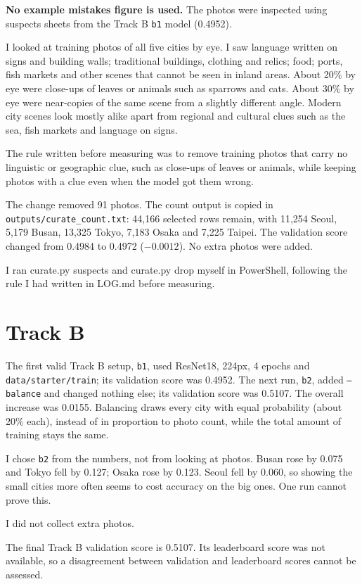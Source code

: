 \documentclass[11pt]{article}
\begin{document}
\textbf{No example mistakes figure is used.} The photos were inspected using
suspects sheets from the Track B \texttt{b1} model (0.4952).

I looked at training photos of all five cities by eye. I saw language written on
signs and building walls; traditional buildings, clothing and relics; food;
ports, fish markets and other scenes that cannot be seen in inland areas. About
20\% by eye were close-ups of leaves or animals such as sparrows and cats. About
30\% by eye were near-copies of the same scene from a slightly different angle.
Modern city scenes look mostly alike apart from regional and cultural clues such
as the sea, fish markets and language on signs.

The rule written before measuring was to remove training photos that carry no
linguistic or geographic clue, such as close-ups of leaves or animals, while
keeping photos with a clue even when the model got them wrong.

The change removed 91 photos. The count output is copied in
\texttt{outputs/curate\_count.txt}: 44,166 selected rows remain, with 11,254
Seoul, 5,179 Busan, 13,325 Tokyo, 7,183 Osaka and 7,225 Taipei. The validation
score changed from 0.4984 to 0.4972 ($-0.0012$). No extra photos were added.

I ran curate.py suspects and curate.py drop myself in PowerShell, following the rule I had written in LOG.md before measuring.

\section*{Track B}

The first valid Track B setup, \texttt{b1}, used ResNet18, 224px, 4 epochs and
\texttt{data/starter/train}; its validation score was 0.4952. The next run,
\texttt{b2}, added \texttt{--balance} and changed nothing else; its validation
score was 0.5107. The overall increase was 0.0155. Balancing draws every city
with equal probability (about 20\% each), instead of in proportion to photo
count, while the total amount of training stays the same.

I chose \texttt{b2} from the numbers, not from looking at photos. Busan rose by
0.075 and Tokyo fell by 0.127; Osaka rose by 0.123. Seoul fell by 0.060, so showing the small cities more often seems to cost
accuracy on the big ones. One run cannot prove this.

I did not collect extra photos.

The final Track B validation score is 0.5107. Its leaderboard score was not available, so a disagreement between validation and leaderboard scores cannot be assessed.
\end{document}
